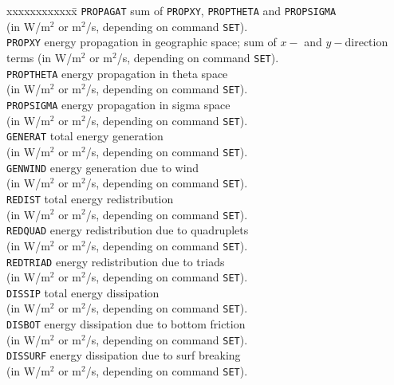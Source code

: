 \documentclass[12pt]{book}
\begin{document}
\begin{tabbing}
 xxxxxxxxxxxx\= \kill
{\tt PROPAGAT} \> sum of {\tt PROPXY}, {\tt PROPTHETA} and {\tt PROPSIGMA}\+\\
                (in W/m$^2$ or m$^2$/s, depending on command {\tt SET}).\-\\
{\tt PROPXY} \> energy propagation in geographic space; sum of $x-$ and $y-$direction\+\\
                terms (in W/m$^2$ or m$^2$/s, depending on command {\tt SET}).\-\\
{\tt PROPTHETA} \> energy propagation in theta space\+\\
                (in W/m$^2$ or m$^2$/s, depending on command {\tt SET}).\-\\
{\tt PROPSIGMA} \> energy propagation in sigma space\+\\
                (in W/m$^2$ or m$^2$/s, depending on command {\tt SET}).\-\\
{\tt GENERAT} \> total energy generation\+\\
                (in W/m$^2$ or m$^2$/s, depending on command {\tt SET}).\-\\
{\tt GENWIND} \> energy generation due to wind\+\\
                (in W/m$^2$ or m$^2$/s, depending on command {\tt SET}).\-\\
{\tt REDIST} \> total energy redistribution\+\\
                (in W/m$^2$ or m$^2$/s, depending on command {\tt SET}).\-\\
{\tt REDQUAD} \> energy redistribution due to quadruplets\+\\
                (in W/m$^2$ or m$^2$/s, depending on command {\tt SET}).\-\\
{\tt REDTRIAD} \> energy redistribution due to triads\+\\
                (in W/m$^2$ or m$^2$/s, depending on command {\tt SET}).\-\\
{\tt DISSIP} \> total energy dissipation\+\\
                (in W/m$^2$ or m$^2$/s, depending on command {\tt SET}).\-\\
{\tt DISBOT} \> energy dissipation due to bottom friction\+\\
                (in W/m$^2$ or m$^2$/s, depending on command {\tt SET}).\-\\
{\tt DISSURF} \> energy dissipation due to surf breaking\+\\
                (in W/m$^2$ or m$^2$/s, depending on command {\tt SET}).\-\\

\end{tabbing}
\end{document}
